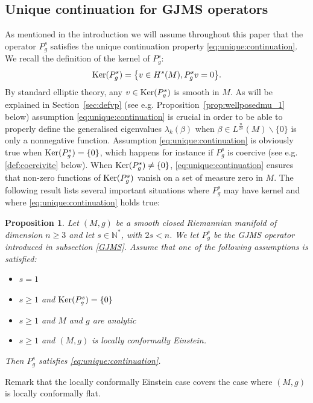 \documentclass[10pt]{amsart}
\numberwithin{equation}{section}
\def\ker{{\mathop{\rm Ker}}}
\theoremstyle{plain}
\newtheorem{prop}[theo]{Proposition}%
\theoremstyle{remark}
\begin{document}
\subsection{Unique continuation for GJMS operators}

As mentioned in the introduction we will assume throughout this paper that the operator $P_g^s$ satisfies the unique continuation property \eqref{eq:unique:continuation}. We recall the definition of the kernel of $P_g^s$:
$$ \ker (P_g^s) = \big \{ v \in H^s(M), P_g^s v = 0 \big \}. $$
By standard elliptic theory, any $v \in \ker (P_g^s)$ is smooth in $M$. As will be explained in Section~\ref{sec:defvp} (see e.g. Proposition~\ref{prop:wellposedmu_1} below) assumption \eqref{eq:unique:continuation} is crucial in order to be able to properly define the generalised eigenvalues $\lambda_k(\beta)$ when $\beta \in L^{\frac{n}{2s}}(M) \backslash \{0 \}$ is only a nonnegative function. Assumption \eqref{eq:unique:continuation}  is obviously true when $\ker(P_g^s) = \{0\}$, which happens for instance if $P_g^s$ is coercive (see e.g. \eqref{def:coercivite} below). When $\ker(P_g^s) \neq \{0\}$, \eqref{eq:unique:continuation} ensures that non-zero functions of $\ker (P_g^s)$ vanish on a set of measure zero in $M$. The following result lists several important situations where $P_g^s$ may have kernel and where \eqref{eq:unique:continuation} holds true:

\begin{prop} \label{prop:unique:continuation}
Let $(M,g)$ be a smooth closed Riemannian manifold of dimension $n \ge 3$ and let $s \in \mathbb{N}^*$, with $2s < n$. We let $P_g^s$ be the GJMS operator introduced in  subsection \ref{GJMS}. Assume that one of the following assumptions is satisfied: 
\begin{itemize}
    \item $s=1$ 
    \item $s \ge 1$ and $\ker(P_g^s) = \{0\}$ 
    \item $s \ge 1$ and $M$ and $g$ are analytic 
   \item $s \ge 1$ and $(M,g)$ is locally conformally Einstein.
\end{itemize}    
Then $P_g^s$ satisfies \eqref{eq:unique:continuation}. 
    \end{prop}
    Remark that the locally conformally Einstein case covers the case where $(M,g)$ is locally conformally flat. 
    
\end{document}
